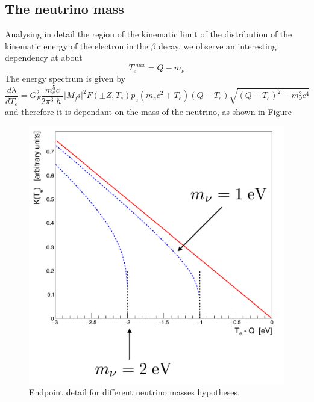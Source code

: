 \subsection{The neutrino mass}
Analysing in detail the region of the kinematic limit of the distribution of the kinematic energy of the electron in the $\beta$ decay, we observe an interesting dependency at about
\begin{equation*}
    T_e^{max} = Q - m_\nu
\end{equation*}
The energy spectrum is given by
\begin{equation*}
    \frac{d\lambda}{dT_e} = G_F^2 \frac{m_e^5c}{2\pi^3 \hslash} |M_fi|^2 F(\pm Z, T_e) p_e(m_ec^2 + T_e) (Q-T_e) \sqrt{(Q-T_e)^2 - m_\nu^2 c^4}
\end{equation*}
and therefore it is dependant on the mass of the neutrino, as shown in Figure 
\begin{figure}
    \centering
    \includegraphics[scale=0.3]{Figures/nuclear-physics-fig21}
    \caption{Endpoint detail for different neutrino masses hypotheses.}
    \label{nuclear-physics-fig:21}
\end{figure}